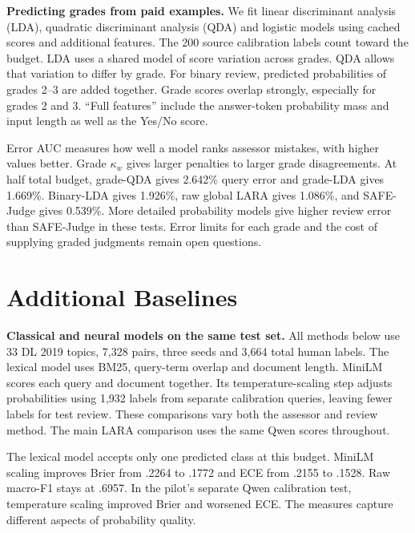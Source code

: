 \documentclass[11pt,a4paper]{article}
\begin{document}
\textbf{Predicting grades from paid examples.} We fit linear discriminant
analysis (LDA), quadratic discriminant analysis (QDA) and logistic models using
cached scores and additional features. The 200 source calibration labels count
toward the budget. LDA uses a shared model of score variation across grades.
QDA allows that variation to differ by grade. For binary review, predicted
probabilities of grades 2--3 are added together. Grade scores overlap strongly,
especially for grades 2 and 3. ``Full features'' include the answer-token
probability mass and input length as well as the Yes/No score.
\begin{center}\small\end{center}
\begin{center}\small\end{center}
Error AUC measures how well a model ranks assessor mistakes, with higher values
better. Grade $\kappa_w$ gives larger penalties to larger grade disagreements.
At half total budget, grade-QDA gives 2.642\% query error and grade-LDA
gives 1.669\%. Binary-LDA gives 1.926\%, raw global LARA gives 1.086\%, and
SAFE-Judge gives 0.539\%. More detailed probability models give higher review
error than SAFE-Judge in these tests. Error limits for each grade and the cost
of supplying graded judgments remain open questions.

\section{Additional Baselines}
\textbf{Classical and neural models on the same test set.} All methods below
use 33 DL 2019 topics, 7,328 pairs, three seeds and 3,664 total human labels.
The lexical model uses BM25, query-term overlap and document length.
MiniLM scores each query and document together. Its temperature-scaling step
adjusts probabilities using 1,932 labels from separate calibration queries,
leaving fewer labels for test review. These comparisons vary both the assessor
and review method. The main LARA comparison uses the same Qwen scores throughout.
\begin{center}\small\end{center}
The lexical model accepts only one predicted class at this budget.
MiniLM scaling improves Brier from .2264 to .1772 and ECE from .2155 to .1528.
Raw macro-F1 stays at .6957. In the pilot's separate Qwen calibration test,
temperature scaling improved Brier and worsened ECE. The measures capture
different aspects of probability quality.
\end{document}

